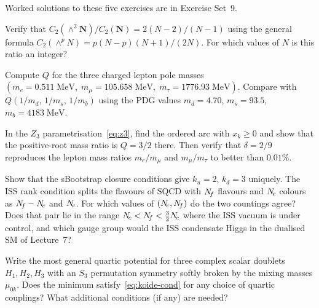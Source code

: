 \documentclass[11pt,a4paper]{article}
\begin{document}
Worked solutions to these five exercises are in Exercise Set~9.

\begin{exercise}
Verify that $C_2(\wedge^2\mathbf{N})/C_2(\mathbf{N})
= 2(N-2)/(N-1)$ using the general formula
$C_2(\wedge^p N) = p(N-p)(N+1)/(2N)$.  For which values
of $N$ is this ratio an integer?
\end{exercise}

\begin{exercise}
Compute $Q$ for the three charged lepton pole masses
$(m_e = 0.511\;\text{MeV},\; m_\mu = 105.658\;\text{MeV},\;
m_\tau = 1776.93\;\text{MeV})$.  Compare with
$Q(1/m_d,\,1/m_s,\,1/m_b)$ using the PDG values
$m_d = 4.70$, $m_s = 93.5$, $m_b = 4183\;\text{MeV}$.
\end{exercise}

\begin{exercise}
In the $Z_3$ parametrisation~\eqref{eq:z3}, find the ordered arc with
$x_k\geq0$ and show that the positive-root mass ratio is $Q=3/2$ there.
Then verify that $\delta = 2/9$ reproduces the lepton mass
ratios $m_e/m_\mu$ and $m_\mu/m_\tau$ to better than
$0.01\%$.
\end{exercise}

\begin{exercise}
Show that the sBootstrap closure conditions give $k_u = 2$,
$k_d = 3$ uniquely.  The ISS rank condition splits the flavours of
SQCD with $N_{\!f}$ flavours and $N_{\!c}$ colours as $N_{\!f} - N_{\!c}$ and
$N_{\!c}$.  For which values of $(N_{\!c}, N_{\!f})$ do the two countings agree?
Does that pair lie in the range $N_{\!c} < N_{\!f} < \tfrac{3}{2}N_{\!c}$ where
the ISS vacuum is under control, and which gauge group would the ISS
condensate Higgs in the dualised SM of Lecture~7?
\end{exercise}

\begin{exercise}[Challenge]
Write the most general quartic potential for three complex
scalar doublets $H_1, H_2, H_3$ with an $S_3$ permutation
symmetry softly broken by the mixing masses $\mu_{0k}$.
Does the minimum satisfy~\eqref{eq:koide-cond} for any
choice of quartic couplings?  What additional conditions
(if any) are needed?
\end{exercise}
\end{document}
